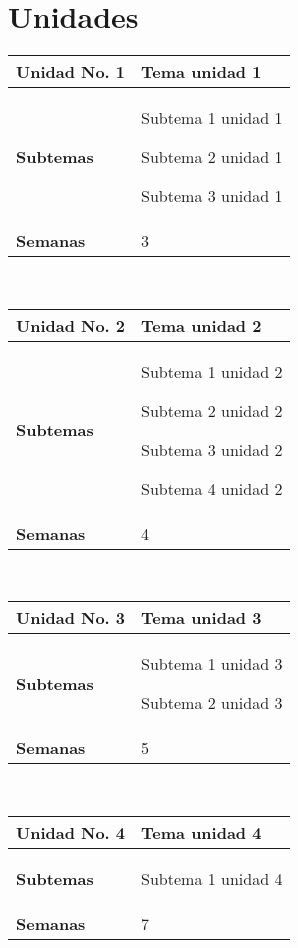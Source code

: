 \documentclass[11pt]{article}
\begin{document}
\section*{Unidades}
\noindent 
\begin{tabular}{R{0.16\textwidth} L{0.7\textwidth}} 
 \\ 
\toprule \textbf{Unidad No. 1} & Tema unidad 1 
 \\ 
\midrule\textbf{Subtemas} & 
\begin{description}
 \item Subtema 1 unidad 1 \item Subtema 2 unidad 1 \item Subtema 3 unidad 1 
\end{description}
 \\ 
\textbf{Semanas} & 3 
\end{tabular} 
 \\ 
 \begin{tabular}{R{0.16\textwidth} L{0.7\textwidth}} 
 \\ 
\toprule \textbf{Unidad No. 2} & Tema unidad 2 
 \\ 
\midrule\textbf{Subtemas} & 
\begin{description}
 \item Subtema 1 unidad 2 \item Subtema 2 unidad 2 \item Subtema 3 unidad 2 \item Subtema 4 unidad 2 
\end{description}
 \\ 
\textbf{Semanas} & 4 
\end{tabular} 
 \\ 
 \begin{tabular}{R{0.16\textwidth} L{0.7\textwidth}} 
 \\ 
\toprule \textbf{Unidad No. 3} & Tema unidad 3 
 \\ 
\midrule\textbf{Subtemas} & 
\begin{description}
 \item Subtema 1 unidad 3 \item Subtema 2 unidad 3 
\end{description}
 \\ 
\textbf{Semanas} & 5 
\end{tabular} 
 \\ 
 \begin{tabular}{R{0.16\textwidth} L{0.7\textwidth}} 
 \\ 
\toprule \textbf{Unidad No. 4} & Tema unidad 4 
 \\ 
\midrule\textbf{Subtemas} & 
\begin{description}
 \item Subtema 1 unidad 4 
\end{description}
 \\ 
\textbf{Semanas} & 7 
\end{tabular} 
 \\ 
 
\end{document}
